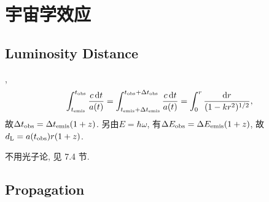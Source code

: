 \chapter{宇宙学效应}

\section{Luminosity Distance}

\cite{Maggiore2014},
\begin{equation}
    \int_{t_\text{emis}}^{t_\text{obs}}\frac{c\,\mathrm{d} t}{a(t)}=    \int_{t_\text{emis}+\Delta t_\text{emis}}^{t_\text{obs}+\Delta t_\text{obs}}\frac{c\,\mathrm{d} t}{a(t)}=\int_0^r\frac{\mathrm{d} r}{(1-kr^2)^{1/2}},
\end{equation}
故$\Delta t_\text{obs}=\Delta t_\text{emis}(1+z)$. 另由$E=\hbar\omega$, 有$\Delta E_\text{obs}=\Delta E_\text{emis}(1+z)$, 故$d_\text{L}=a(t_\text{obs})r(1+z)$.

不用光子论, 见\cite{Ellis2012} 7.4 节.

\section{Propagation}


